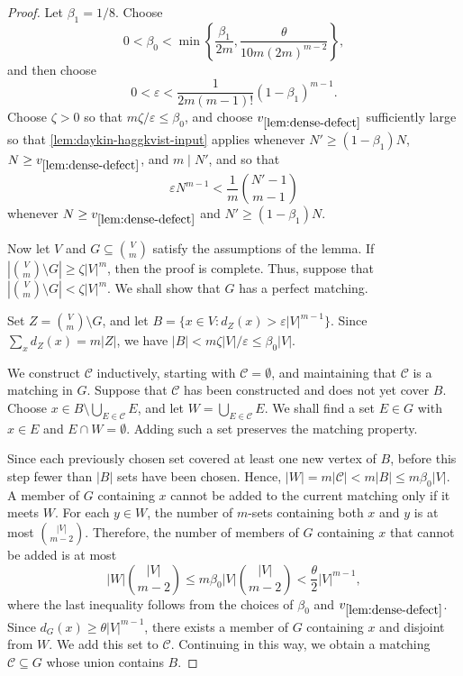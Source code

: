 \documentclass[10pt,a4paper]{article}
\numberwithin{equation}{section}
\theoremstyle{definition}
\begin{document}
\begin{proof}
        Let $\beta_1=1/8$.
        Choose
        \[
                0<\beta_0<\min\left\{\frac{\beta_1}{2m},
                \frac{\theta}{10m(2m)^{m-2}}\right\},
        \]
        and then choose
        \[
                0<\varepsilon<\frac{1}{2m(m-1)!}(1-\beta_1)^{m-1}.
        \]
        Choose $\zeta>0$ so that $m\zeta/\varepsilon\le\beta_0$, and choose $v_{\ref{lem:dense-defect}}$ sufficiently large so that \cref{lem:daykin-haggkvist-input} applies whenever $N'\ge (1-\beta_1)N$, $N\ge v_{\ref{lem:dense-defect}}$, and $m\mid N'$, and so that
        \begin{equation}\label{eq:DH-delta-explicit}
                \varepsilon N^{m-1}<\frac1m\binom{N'-1}{m-1}
        \end{equation}
        whenever $N\ge v_{\ref{lem:dense-defect}}$ and $N'\ge(1-\beta_1)N$.

        Now let $V$ and $G\subseteq\binom Vm$ satisfy the assumptions of the lemma.
        If $\left|\binom Vm\setminus G\right|\ge\zeta |V|^m$, then the proof is complete.
        Thus, suppose that $\left|\binom Vm\setminus G\right|<\zeta |V|^m$.
        We shall show that $G$ has a perfect matching.

        Set $Z=\binom Vm\setminus G$, and let $B=\{x\in V:d_Z(x)>\varepsilon |V|^{m-1}\}$.
        Since $\sum_x d_Z(x)=m|Z|$, we have $|B|<m\zeta |V|/\varepsilon\le\beta_0|V|$.

        We construct $\mathcal C$ inductively, starting with $\mathcal C=\emptyset$, and maintaining that $\mathcal C$ is a matching in $G$.
        Suppose that $\mathcal C$ has been constructed and does not yet cover $B$.
        Choose $x\in B\setminus\bigcup_{E\in\mathcal C}E$, and let $W=\bigcup_{E\in\mathcal C}E$.
        We shall find a set $E\in G$ with $x\in E$ and $E\cap W=\emptyset$.
        Adding such a set preserves the matching property.

        Since each previously chosen set covered at least one new vertex of $B$, before this step fewer than $|B|$ sets have been chosen.
        Hence, $|W|=m|\mathcal C|<m|B|\le m\beta_0|V|$.
        A member of $G$ containing $x$ cannot be added to the current matching only if it meets $W$.
        For each $y\in W$, the number of $m$-sets containing both $x$ and $y$ is at most $\binom{|V|}{m-2}$.
        Therefore, the number of members of $G$ containing $x$ that cannot be added is at most
        \[
                |W|\binom{|V|}{m-2}
                \le m\beta_0|V|\binom{|V|}{m-2}
                <\frac{\theta}{2}|V|^{m-1},
        \]
        where the last inequality follows from the choices of $\beta_0$ and $v_{\ref{lem:dense-defect}}$.
        Since $d_G(x)\ge\theta |V|^{m-1}$, there exists a member of $G$ containing $x$ and disjoint from $W$.
        We add this set to $\mathcal C$.
        Continuing in this way, we obtain a matching $\mathcal C\subseteq G$ whose union contains $B$.


\end{proof}
\end{document}
